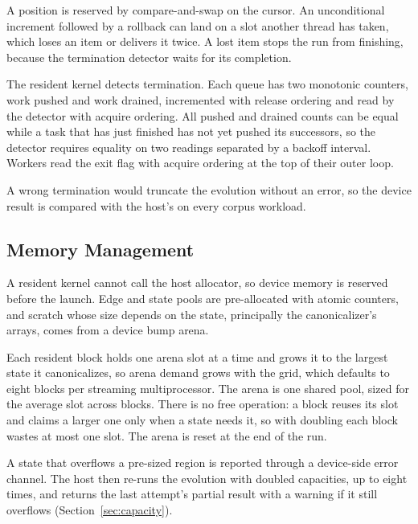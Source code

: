 \documentclass[9pt,twocolumn,a4paper]{extarticle}
\begin{document}
A position is reserved by compare-and-swap on the cursor. An unconditional increment followed by a
rollback can land on a slot another thread has taken, which loses an item or delivers it twice. A
lost item stops the run from finishing, because the termination detector waits for its completion.

The resident kernel detects termination. Each queue has two monotonic counters, work pushed and
work drained, incremented with release ordering and read by the detector with acquire ordering.
All pushed and drained counts can be equal while a task that has just finished has not yet pushed
its successors, so the detector requires equality on two readings separated by a backoff
interval. Workers read the exit flag with acquire ordering at the top of their outer loop.

A wrong termination would truncate the evolution without an error, so the device result is compared
with the host's on every corpus workload.

\subsection{Memory Management}

A resident kernel cannot call the host allocator, so device memory is reserved before the launch.
Edge and state pools are pre-allocated with atomic counters, and scratch whose size depends on the
state, principally the canonicalizer's arrays, comes from a device bump arena.

Each resident block holds one arena slot at a time and grows it to the largest state it
canonicalizes, so arena demand grows with the grid, which defaults to eight blocks per streaming
multiprocessor. The arena is one shared pool, sized for the average slot across blocks. There is no
free operation: a block reuses its slot and claims a larger one only when a state needs it, so with
doubling each block wastes at most one slot. The arena is reset at the end of the run.

A state that overflows a pre-sized region is reported through a device-side error channel. The host
then re-runs the evolution with doubled capacities, up to eight times, and returns the last
attempt's partial result with a warning if it still overflows (Section~\ref{sec:capacity}).

\end{document}
